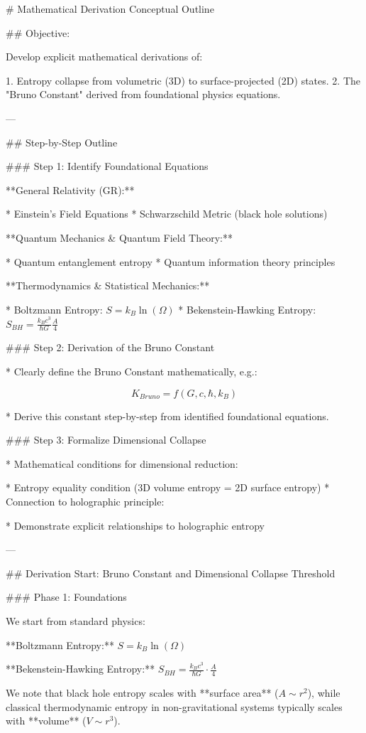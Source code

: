 # Mathematical Derivation Conceptual Outline

## Objective:

Develop explicit mathematical derivations of:

1. Entropy collapse from volumetric (3D) to surface-projected (2D) states.
2. The "Bruno Constant" derived from foundational physics equations.

---

## Step-by-Step Outline

### Step 1: Identify Foundational Equations

**General Relativity (GR):**

* Einstein's Field Equations
* Schwarzschild Metric (black hole solutions)

**Quantum Mechanics & Quantum Field Theory:**

* Quantum entanglement entropy
* Quantum information theory principles

**Thermodynamics & Statistical Mechanics:**

* Boltzmann Entropy: $S = k_B \ln(\Omega)$
* Bekenstein-Hawking Entropy: $S_{BH} = \frac{k_B c^3}{\hbar G} \frac{A}{4}$

### Step 2: Derivation of the Bruno Constant

* Clearly define the Bruno Constant mathematically, e.g.:

$$
K_{Bruno} = f(G, c, \hbar, k_B)
$$

* Derive this constant step-by-step from identified foundational equations.

### Step 3: Formalize Dimensional Collapse

* Mathematical conditions for dimensional reduction:

  * Entropy equality condition (3D volume entropy = 2D surface entropy)
* Connection to holographic principle:

  * Demonstrate explicit relationships to holographic entropy

---

## Derivation Start: Bruno Constant and Dimensional Collapse Threshold

### Phase 1: Foundations

We start from standard physics:

**Boltzmann Entropy:**
$S = k_B \ln(\Omega)$

**Bekenstein-Hawking Entropy:**
$S_{BH} = \frac{k_B c^3}{\hbar G} \cdot \frac{A}{4}$

We note that black hole entropy scales with **surface area** ($A \sim r^2$), while classical thermodynamic entropy in non-gravitational systems typically scales with **volume** ($V \sim r^3$).

